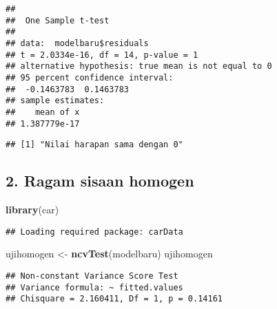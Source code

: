\documentclass[
]{article}
\newenvironment{Shaded}{\begin{snugshade}}{\end{snugshade}}
\newcommand{\FloatTok}[1]{\textcolor[rgb]{0.00,0.00,0.81}{#1}}
\newcommand{\FunctionTok}[1]{\textcolor[rgb]{0.13,0.29,0.53}{\textbf{#1}}}
\newcommand{\NormalTok}[1]{#1}
\newcommand{\OtherTok}[1]{\textcolor[rgb]{0.56,0.35,0.01}{#1}}
\newcommand{\SpecialCharTok}[1]{\textcolor[rgb]{0.81,0.36,0.00}{\textbf{#1}}}
\newcommand{\StringTok}[1]{\textcolor[rgb]{0.31,0.60,0.02}{#1}}
\begin{document}
\begin{verbatim}
## 
##  One Sample t-test
## 
## data:  modelbaru$residuals
## t = 2.0334e-16, df = 14, p-value = 1
## alternative hypothesis: true mean is not equal to 0
## 95 percent confidence interval:
##  -0.1463783  0.1463783
## sample estimates:
##    mean of x 
## 1.387779e-17
\end{verbatim}

\begin{Shaded}
\end{Shaded}

\begin{verbatim}
## [1] "Nilai harapan sama dengan 0"
\end{verbatim}

\hypertarget{ragam-sisaan-homogen-1}{%
\subsection{2. Ragam sisaan homogen}\label{ragam-sisaan-homogen-1}}

\begin{Shaded}
\begin{Highlighting}[]
\FunctionTok{library}\NormalTok{(car)}
\end{Highlighting}
\end{Shaded}

\begin{verbatim}
## Loading required package: carData
\end{verbatim}

\begin{Shaded}
\begin{Highlighting}[]
\NormalTok{ujihomogen }\OtherTok{\textless{}{-}} \FunctionTok{ncvTest}\NormalTok{(modelbaru)}
\NormalTok{ujihomogen}
\end{Highlighting}
\end{Shaded}

\begin{verbatim}
## Non-constant Variance Score Test 
## Variance formula: ~ fitted.values 
## Chisquare = 2.160411, Df = 1, p = 0.14161
\end{verbatim}
\end{document}
